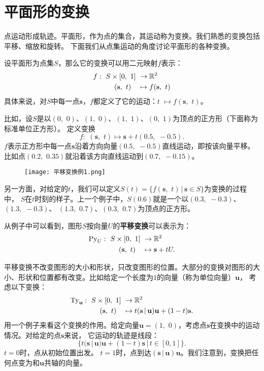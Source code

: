 \documentclass[12pt,UTF8]{ctexbook}
\begin{document}
\section{平面形的变换}
点运动形成轨迹。平面形，作为点的集合，其运动称为变换。我们熟悉的变换包括平移、缩放和旋转。
下面我们从点集运动的角度讨论平面形的各种变换。

设平面形为点集$S$，那么它的变换可以用二元映射$f$表示：
\begin{align}
    f: \,\, S\times[0,\,\,1] \,\,&\rightarrow \mathbb{R}^2 \notag \\
    (\mathbf{s},\,\, t) \quad &\mapsto f(\mathbf{s},\,\,t) \notag
\end{align}
具体来说，对$S$中每一点$\mathbf{s}$，$f$都定义了它的运动：$t\,\,\mapsto f(\mathbf{s},\,\,t)$。

比如，设$S$是以$(0,\,\,0)$、$(1,\,\,0)$、$(1,\,\,1)$、$(0,\,\,1)$为顶点的正方形（下面称为标准单位正方形）。
定义变换
$$f:\,\, (\mathbf{s}, \,\,t) \mapsto \mathbf{s} + t(0.5, \,\, -0.5). $$
$f$表示正方形中每一点$\mathbf{s}$沿着方向向量$(0.5, \,\, -0.5)$直线运动，即按该向量平移。
比如点$(0.2,\,\,0.35)$就沿着该方向直线运动到$(0.7, \,\,-0.15)$。

\begin{figure}[h] %
    \vspace{4pt}
    \centering
    \texttt{[image: 平移变换例1.png]}
\end{figure}

另一方面，对给定的$t$，我们可以定义$S(t) = \{f(\mathbf{s},\,\,t) \, | \, \mathbf{s}\in S\}$为变换的过程中，
$S$在$t$时刻的样子。上一个例子中，$S(0.6)$就是一个以$(0.3,\,\,-0.3)$、$(1.3,\,\,-0.3)$、
$(1.3,\,\,0.7)$、$(0.3,\,\,0.7)$为顶点的正方形。

从例子中可以看到，图形$S$按向量$U$的\textbf{平移变换}可以表示为：
\begin{align}
    \mathrm{Py}_U: \,\, S\times[0,\,\,1] \,\,&\rightarrow \mathbb{R}^2 \notag \\
    (\mathbf{s},\,\, t) \quad &\mapsto \mathbf{s} + tU. \notag
\end{align}

平移变换不改变图形的大小和形状，只改变图形的位置。大部分的变换对图形的大小、形状和位置都有改变。比如给定一个长度为$1$的向量（称为单位向量）$\mathbf{u}$，
考虑以下变换：
\begin{align}
    \mathrm{Ty}_\mathbf{u}: \,\, S\times[0,\,\,1] \,\,&\rightarrow \mathbb{R}^2 \notag \\
    (\mathbf{s},\,\, t) \quad &\mapsto t(\mathbf{s}\,|\,\mathbf{u})\mathbf{u} + (1 - t)\mathbf{s}. \notag
\end{align}
用一个例子来看这个变换的作用。给定向量$\mathbf{u} = (1,\,\,0)$，考虑点$\mathbf{s}$在变换中的运动情况。对给定的点$\mathbf{s}$来说，
它运动的轨迹是线段：
$$\{t(\mathbf{s}\,|\,\mathbf{u})\mathbf{u} + (1 - t)\mathbf{s} \, | \, t\in[0,1]\}.$$
$t=0$时，点从初始位置出发。
$t=1$时，点到达$(\mathbf{s}\,|\,\mathbf{u})\mathbf{u}$。我们注意到，变换把任何点变为和$\mathbf{u}$共轴的向量。
\end{document}
